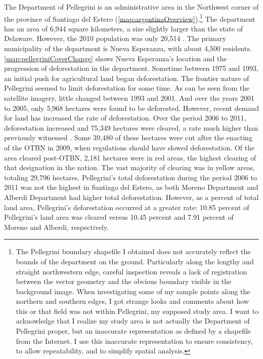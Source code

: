 The Department of Pellegrini is an administrative area in the Northwest corner of the province of Santiago del Estero (\autoref{map:argentinaOverview}).\footnote{The Pellegrini boundary shapefile I obtained does not accurately reflect the bounds of the department on the ground. Particularly along the lengthy and straight northwestern edge, careful inspection reveals a lack of registration between the vector geometry and the obvious boundary visible in the background image. When investigating some of my sample points along the northern and southern edges, I got strange looks and comments about how this or that field was not within Pellegrini, my supposed study area. I want to acknowledge that I realize my study area is not actually the Department of Pellegrini proper, but an inaccurate representation as defined by a shapefile from the Internet. I use this inaccurate representation to ensure consistency, to allow repeatability, and to simplify spatial analysis.} The department has an area of 6,944 square kilometers, a size slightly larger than the state of Delaware. However, the 2010 population was only 20,514 \autocite{estadistica-y-c2010b}. The primary municipality of the department is Nueva Esperanza, with about 4,500 residents. \autoref{map:pellegriniCoverChange} shows Nueva Esperanza's location and the progression of deforestation in the department. Sometime between 1975 and 1993, an initial push for agricultural land began deforestation. The frontier nature of Pellegrini seemed to limit deforestation for some time. As can be seen from the satellite imagery, little changed between 1993 and 2001. And over the years 2001 to 2005, \textcite{volante2005analisis} only 5,968 hectares were found to be deforested. However, recent demand for land has increased the rate of deforestation. Over the period 2006 to 2011, deforestation increased and 75,349 hectares were cleared, a rate much higher than previously witnessed \autocite{secreteria-de-a2012monitoreo}. Some 39,480 of these hectares were cut after the enacting of the OTBN in 2009, when regulations should have slowed deforestation. Of the area cleared post-OTBN, 2,181 hectares were in red areas, the highest clearing of that designation in the nation. The vast majority of clearing was in yellow areas, totaling 29,796 hectares. Pellegrini’s total deforestation during the period 2006 to 2011 was not the highest in Santiago del Estero, as both Moreno Department and Alberdi Department had higher total deforestation. However, as a percent of total land area, Pellegrini’s deforestation occurred at a greater rate: 10.85 percent of Pellegrini’s land area was cleared versus 10.45 percent and 7.91 percent of Moreno and Alberdi, respectively.

